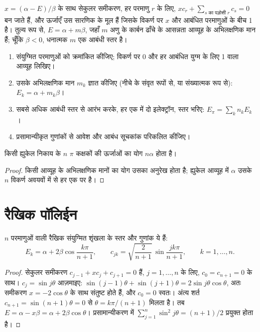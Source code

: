 $x = (\alpha - E)/\beta$ के साथ सेकुलर समीकरण, हर परमाणु $r$ के लिए,
$xc_r + \sum_{s \text{ का पड़ोसी } r} c_s = 0$ बन जाते हैं, और ऊर्जाएँ उस
सारणिक के मूल हैं जिसके विकर्ण पर $x$ और आबंधित परमाणुओं के बीच 1 है। तुल्य रूप से, $E =
\alpha + m\beta$, जहाँ $m$ अणु के कार्बन ढाँचे के आसन्नता आव्यूह के अभिलक्षणिक मान हैं;
चूँकि $\beta < 0$, धनात्मक $m$ एक आबंधी स्तर है।

\begin{method}[ह्युकेल परिकलन]\label{met:b2:huckel:huckel}
\begin{enumerate}
  \item संयुग्मित परमाणुओं को क्रमांकित कीजिए; विकर्ण पर 0 और हर आबंधित
        युग्म के लिए 1 वाला आव्यूह लिखिए।
  \item उसके अभिलक्षणिक मान $m_k$ ज्ञात कीजिए (नीचे के संवृत रूपों से, या संख्यात्मक रूप से): $E_k =
        \alpha + m_k\beta$।
  \item सबसे अधिक आबंधी स्तर से आरंभ करके, हर एक में दो इलेक्ट्रॉन, स्तर भरिए:
        $E_\pi = \sum_k n_k E_k$।
  \item प्रसामान्यीकृत गुणांकों से आवेश और आबंध सूचकांक परिकलित कीजिए।
\end{enumerate}
\end{method}

\begin{proposition}[अनुरेख]\label{prop:b2:huckel:trace}
किसी ह्युकेल निकाय के $n$ $\pi$ कक्षकों की ऊर्जाओं का योग $n\alpha$ होता है।
\end{proposition}

\begin{proof}
किसी आव्यूह के अभिलक्षणिक मानों का योग उसका अनुरेख होता है; ह्युकेल आव्यूह में $\alpha$
उसके $n$ विकर्ण अवयवों में से हर एक पर है।
\end{proof}

\section{रैखिक पॉलिईन}

\begin{theorem}[रैखिक शृंखला के स्तर]\label{thm:b2:huckel:polyene}
$n$ परमाणुओं वाली रैखिक संयुग्मित शृंखला के स्तर और गुणांक ये हैं:
\[
  E_k = \alpha + 2\beta\cos\frac{k\pi}{n + 1}, \qquad
  c_{jk} = \sqrt{\frac{2}{n + 1}}\,\sin\frac{jk\pi}{n + 1}, \qquad k = 1, \dots, n .
\]
\end{theorem}

\begin{proof}
सेकुलर समीकरण $c_{j-1} + xc_j + c_{j+1} = 0$ हैं, $j = 1, \dots, n$ के लिए,
$c_0 = c_{n+1} = 0$ के साथ। $c_j = \sin j\theta$ आज़माइए: $\sin(j - 1)\theta + \sin(j + 1)\theta = 2\sin
j\theta\cos\theta$, अतः समीकरण $x = -2\cos\theta$ के साथ संतुष्ट होते हैं, और $c_0 = 0$
स्वतः। अंत्य शर्त $c_{n+1} = \sin(n + 1)\theta = 0$ से $\theta =
k\pi/(n + 1)$ मिलता है। तब $E = \alpha - x\beta = \alpha + 2\beta\cos\theta$। प्रसामान्यीकरण में
$\sum_{j=1}^n\sin^2 j\theta = (n + 1)/2$ प्रयुक्त होता है।
\end{proof}

